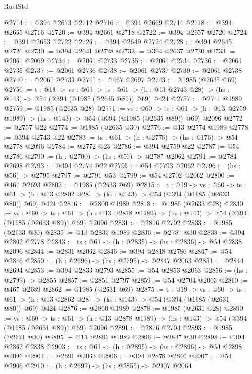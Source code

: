\begin{lexlean}{RustStd}
\begin{coremodule}
@2714 := @394 @2673 @2712
@2716 := @394 @2669 @2714
@2718 := @394 @2665 @2716
@2720 := @394 @2661 @2718
@2722 := @394 @2657 @2720
@2724 := @394 @2653 @2722
@2726 := @394 @2649 @2724
@2728 := @394 @2645 @2726
@2730 := @394 @2641 @2728
@2732 := @394 @2637 @2730
@2733 := @2061 @2069
@2734 := @2061 @2733
@2735 := @2061 @2734
@2736 := @2061 @2735
@2737 := @2061 @2736
@2738 := @2061 @2737
@2739 := @2061 @2738
@2740 := @2061 @2739
@2741 := @467 @2697
@2743 := @1985 (@2635 @69)
@2756 := {t : @19} ->
  {vs : @60} ->
  {ts : @61} -> (h : @13 @2743 @28) -> (hs : @143) -> @54 (@394 (@1985 (@2635 @80)) @69) @424
@2757 := @2741 @1989
@2759 := @1985 (@2635 @28)
@2771 := {vs : @60} ->
  {ts : @61} -> (h : @13 @2759 @1989) -> (hs : @143) -> @54 (@394 (@1985 (@2635 @89)) @69) @2096
@2772 := @2757 @22
@2774 := @1985 (@2635 @30)
@2776 := @13 @2774 @1989
@2778 := @394 @2743 @22
@2783 := {ts : @61} -> (h : @2776) -> (hs : @176) -> @54 @2778 @2096
@2784 := @2772 @23
@2786 := @394 @2759 @22
@2787 := @54 @2786
@2790 := (h : @2700) -> (hs : @56) -> @2787 @2062
@2791 := @2784 @2698
@2793 := @394 @2774 @22
@2795 := @54 @2793 @2062
@2796 := (hs : @56) -> @2795
@2797 := @2791 @53
@2799 := @54 @2702 @2062
@2800 := @467 @2693
@2802 := @1985 (@2633 @69)
@2815 := {t : @19} ->
  {vs : @60} ->
  {ts : @61} -> (h : @13 @2802 @28) -> (hs : @143) -> @54 (@394 (@1985 (@2633 @80)) @69) @424
@2816 := @2800 @1989
@2818 := @1985 (@2633 @28)
@2830 := {vs : @60} ->
  {ts : @61} -> (h : @13 @2818 @1989) -> (hs : @143) -> @54 (@394 (@1985 (@2633 @89)) @69) @2096
@2831 := @2816 @2702
@2833 := @1985 (@2633 @30)
@2835 := @13 @2833 @1989
@2836 := @2787 @30
@2838 := @394 @2802 @2778
@2843 := {ts : @61} -> (h : @2835) -> (hs : @2836) -> @54 @2838 @2096
@2844 := @2831 @2062
@2846 := @394 @2818 @2786
@2847 := @54 @2846
@2850 := (h : @2696) -> (hs : @2795) -> @2847 @2063
@2851 := @2844 @2694
@2853 := @394 @2833 @2793
@2855 := @54 @2853 @2063
@2856 := (hs : @2799) -> @2855
@2857 := @2851 @2797
@2859 := @54 @2704 @2063
@2860 := @467 @2689
@2862 := @1985 (@2631 @69)
@2875 := {t : @19} ->
  {vs : @60} ->
  {ts : @61} -> (h : @13 @2862 @28) -> (hs : @143) -> @54 (@394 (@1985 (@2631 @80)) @69) @424
@2876 := @2860 @1989
@2878 := @1985 (@2631 @28)
@2890 := {vs : @60} ->
  {ts : @61} -> (h : @13 @2878 @1989) -> (hs : @143) -> @54 (@394 (@1985 (@2631 @89)) @69) @2096
@2891 := @2876 @2704
@2893 := @1985 (@2631 @30)
@2895 := @13 @2893 @1989
@2896 := @2847 @30
@2898 := @394 @2862 @2838
@2903 := {ts : @61} -> (h : @2895) -> (hs : @2896) -> @54 @2898 @2096
@2904 := @2891 @2063
@2906 := @394 @2878 @2846
@2907 := @54 @2906
@2910 := (h : @2692) -> (hs : @2855) -> @2907 @2064

\end{coremodule}
\end{lexlean}
